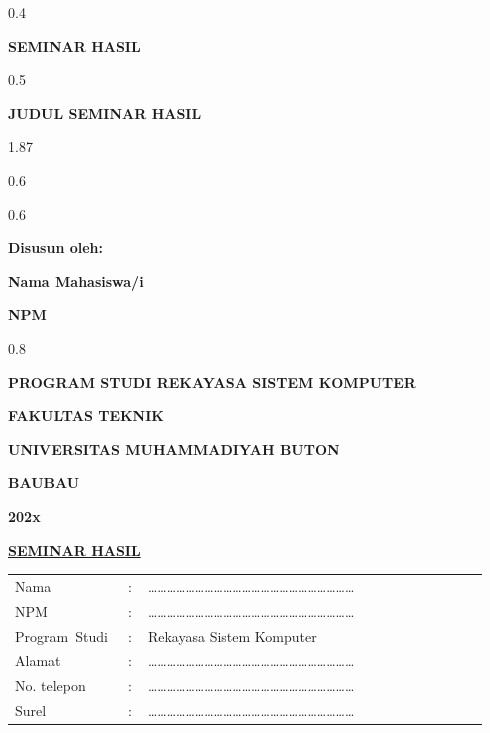\thispagestyle{empty}
\begin{ruang}{0.4}\end{ruang}
\begin{sampulbesar}
\textbf{SEMINAR HASIL}
\end{sampulbesar}
\begin{ruang}{0.5}\end{ruang}
\begin{sampulbesar}
\textbf{JUDUL SEMINAR HASIL}
\end{sampulbesar}
\begin{ruang}{1.87}\end{ruang}
\begin{ruang}{0.6}\end{ruang}
\begin{tengah}
\logo{4.5cm}
\end{tengah}
\begin{ruang}{0.6}\end{ruang}
\begin{sampulsedang}
\textbf{Disusun oleh:}

\textbf{Nama Mahasiswa/i}

\textbf{NPM}
\end{sampulsedang}
\begin{ruang}{0.8}\end{ruang}
\begin{sampulsedang}
\textbf{PROGRAM STUDI REKAYASA SISTEM KOMPUTER}

\textbf{FAKULTAS TEKNIK}

\textbf{UNIVERSITAS MUHAMMADIYAH BUTON}

\textbf{BAUBAU}

\textbf{202x}
\end{sampulsedang}
\begin{halamanbaru}\end{halamanbaru}

\thispagestyle{empty}
\begin{tengah}
\textbf{\underline{SEMINAR HASIL}}
\end{tengah}

\begin{tanpagaris}
\begin{longtable}{@{}p{0.22\linewidth}p{0.04\linewidth}p{0.68\linewidth}@{}}
Nama & : & ………………………………………………………… \\[6pt]
NPM & : & ………………………………………………………… \\[6pt]
\mbox{Program Studi} & : & Rekayasa Sistem Komputer \\[6pt]
Alamat & : & ………………………………………………………… \\[6pt]
No. telepon & : & ………………………………………………………… \\[6pt]
Surel & : & ………………………………………………………… \\
\end{longtable}
\end{tanpagaris}

